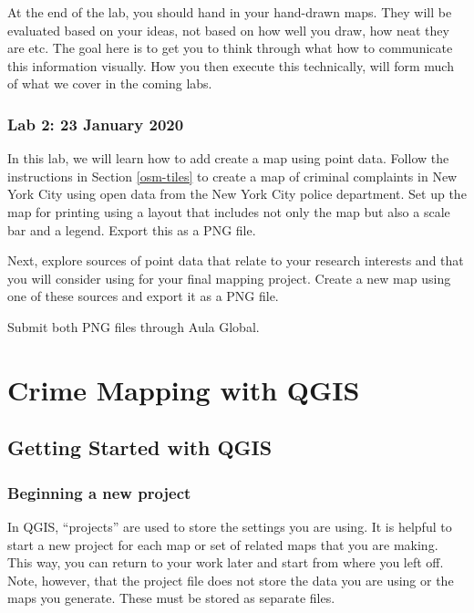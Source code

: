 \documentclass[]{book}
\begin{document}
At the end of the lab, you should hand in your hand-drawn maps. They will be evaluated based on your ideas, not based on how well you draw, how neat they are etc. The goal here is to get you to think through what how to communicate this information visually. How you then execute this technically, will form much of what we cover in the coming labs.

\hypertarget{lab-2-23-january-2020}{%
\section*{Lab 2: 23 January 2020}\label{lab-2-23-january-2020}}

In this lab, we will learn how to add create a map using point data. Follow the instructions in Section \ref{osm-tiles} to create a map of criminal complaints in New York City using open data from the New York City police department. Set up the map for printing using a layout that includes not only the map but also a scale bar and a legend. Export this as a PNG file.

Next, explore sources of point data that relate to your research interests and that you will consider using for your final mapping project. Create a new map using one of these sources and export it as a PNG file.

Submit both PNG files through Aula Global.

\hypertarget{part-crime-mapping-with-qgis}{%
\part{Crime Mapping with QGIS}\label{part-crime-mapping-with-qgis}}

\hypertarget{getting-started-with-qgis}{%
\chapter{Getting Started with QGIS}\label{getting-started-with-qgis}}

\hypertarget{beginning-a-new-project}{%
\section{Beginning a new project}\label{beginning-a-new-project}}

In QGIS, ``projects'' are used to store the settings you are using. It is helpful to start a new project for each map or set of related maps that you are making. This way, you can return to your work later and start from where you left off. Note, however, that the project file does not store the data you are using or the maps you generate. These must be stored as separate files.
\end{document}
